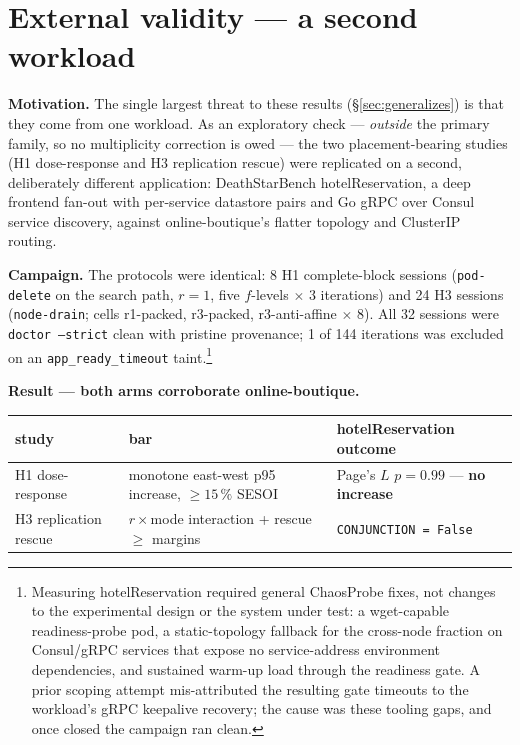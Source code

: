 \section{External validity --- a second workload}\label{sec:external-validity}

\textbf{Motivation.} The single largest threat to these results
(\S\ref{sec:generalizes}) is that they come from one workload. As an exploratory
check --- \emph{outside} the primary family, so no multiplicity
correction is owed --- the two placement-bearing studies (H1 dose-response and
H3 replication rescue) were replicated on a second, deliberately different
application: DeathStarBench hotelReservation, a deep frontend fan-out with
per-service datastore pairs and Go gRPC over Consul service discovery, against
online-boutique's flatter topology and ClusterIP routing.

\textbf{Campaign.} The protocols were identical: 8 H1 complete-block sessions
(\texttt{pod-delete} on the search path, $r{=}1$, five $f$-levels $\times$ 3
iterations) and 24 H3 sessions (\texttt{node-drain}; cells r1-packed,
r3-packed, r3-anti-affine $\times$ 8). All 32 sessions were
\texttt{doctor --strict} clean with pristine provenance; 1 of 144 iterations was
excluded on an \texttt{app\_ready\_timeout} taint.\footnote{Measuring
hotelReservation required general ChaosProbe fixes, not changes to the
experimental design or the system under test: a wget-capable readiness-probe
pod, a static-topology fallback for the cross-node fraction on Consul/gRPC
services that expose no service-address environment dependencies, and sustained
warm-up load through the readiness gate. A prior scoping attempt mis-attributed
the resulting gate timeouts to the workload's gRPC keepalive recovery; the cause
was these tooling gaps, and once closed the campaign ran clean.}

\textbf{Result --- both arms corroborate online-boutique.}

\begin{center}
\begin{tabular}{lll}
\toprule
study & bar & hotelReservation outcome \\
\midrule
H1 dose-response & monotone east-west p95 increase, $\geq 15\,\%$ SESOI &
  Page's $L$ $p = 0.99$ --- \textbf{no increase} \\
H3 replication rescue & $r{\times}$mode interaction + rescue $\geq$ margins &
  \texttt{CONJUNCTION = False} \\
\bottomrule
\end{tabular}
\end{center}

